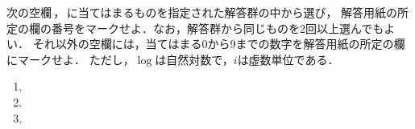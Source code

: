 \documentclass[../../../uem_mat_mei_q.tex]{subfiles}
\begin{document}
    次の空欄\:\,，\,\:に当てはまるものを指定された解答群の中から選び，%
    解答用紙の所定の欄の番号をマークせよ．なお，解答群から同じものを2回以上選んでもよい．%
    それ以外の空欄には，当てはまる0から9までの数字を解答用紙の所定の欄にマークせよ．%
    ただし，$\log$は自然対数で，$i$は虚数単位である．
    
    \begin{enumerate}
        \item 
        \item 
        \item 
    \end{enumerate}
\end{document}
